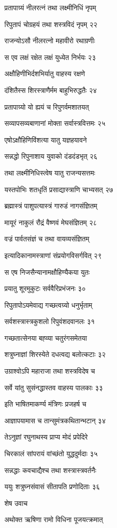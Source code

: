 प्रतापाग्र्यं नीलरत्नं तथा लक्ष्मीनिधिं नृपम्

रिपुतापं चोग्रहयं तथा शस्त्रविदं नृपम् २२

राजन्योऽसौ नीलरत्नो महावीरो रथाग्रणीः

स एव लक्षं रक्षेत लक्षं युध्येत निर्भयः २३

अक्षौहिणीभिर्दशभिर्यातु वाहस्य रक्षणे

दंशितैस्स शिरस्त्राणैर्मम बाहुभिरुद्धतैः २४

प्रतापाग्र्यो यो ह्ययं च रिपुगर्वमशातयत्

सव्यापसव्यबाणानां मोक्ता सर्वास्त्रवित्तमः २५

एषोऽक्षौहिणिविंशत्या यातु यज्ञहयावने

सन्नद्धो रिपुनाशाय युवाको दंडदंडभृत् २६

तथा लक्ष्मीनिधिस्त्वेष यातु राजन्यसत्तमः

यस्तपोभिः शतधृतिं प्रसाद्यास्त्राणि चाभ्यसत् २७

ब्रह्मास्त्रं पाशुपत्यास्त्रं गारुडं नागसंज्ञितम्

मायूरं नाकुलं रौद्रं वैष्णवं मेघसंज्ञितम् २८

वज्रं पार्वतसंज्ञं च तथा वायव्यसंज्ञितम्

इत्यादिकानामस्त्राणां संप्रयोगविसर्गवित् २९

स एष निजसैन्यानामक्षौहिण्यैकया युतः

प्रयातु शूरमुकुटः सर्ववैरिप्रभंजनः ३०

रिपुतापोऽयमेवाद्य गच्छत्वग्र्यो धनुर्भृताम्

सर्वशस्त्रास्त्रकुशलो रिपुवंशदवानलः ३१

गच्छतात्सेनया बह्व्या चतुरंगसमेतया

शत्रुघ्नाज्ञां शिरस्येते दधत्वद्य बलोत्कटाः ३२

उग्राश्वोऽपि महाराजा तथा शस्त्रविदेष च

सर्वे यांतु सुसंनद्धास्तव वाहस्य पालकाः ३३

इति भाषितमाकर्ण्य मंत्रिणः प्रजहर्ष च

आज्ञापयामास च तान्सुमंत्रकथितान्भटान् ३४

तेऽनुज्ञां रघुनाथस्य प्राप्य मोदं प्रपेदिरे

चिरकालं सांपरायं वांच्छंतो युद्धदुर्मदाः ३५

सन्नद्धाः कवचाद्यैश्च तथा शस्त्रास्त्रवर्तनैः

ययुः शत्रुघ्नसंवासं सीतापति प्रणोदिताः ३६

शेष उवाच

अथोक्त ऋषिणा रामो विधिना पूजयत्क्रमात्

